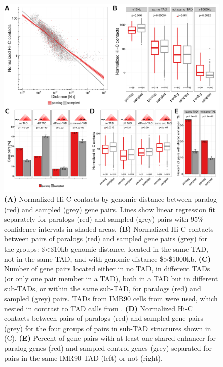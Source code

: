 \documentclass[a4paper,twoside=true,openright,parskip=full,chapterprefix=true,11pt,headings=normal,bibliography=totoc,listof=totoc,titlepage=on,captions=tableabove,draft=false]{scrreprt}
\theoremstyle{definition}
\theoremstyle{definition}
\theoremstyle{definition}
\theoremstyle{remark}
\begin{document}
\begin{figure}

{\centering \includegraphics[width=0.8\linewidth]{figures/paralog/fig4_09} 

}

\caption{\textbf{(A)} Normalized Hi-C contacts by genomic
distance between paralog (red) and sampled (grey) gene pairs. Lines show
linear regression fit separately for paralogs (red) and sampled (grey)
pairs with 95\% confidence intervals in shaded areas. \textbf{(B)}
Normalized Hi-C contacts between pairs of paralogs (red) and sampled
gene pairs (grey) for the groups: \$\textless{}\$10kb genomic distance,
located in the same TAD, not in the same TAD, and with genomic distance
\$\textgreater{}\$1000kb. \textbf{(C)} Number of gene pairs located
either in no TAD, in different TADs (or only one pair member in a TAD),
both in a TAD but in different sub-TADs, or within the same sub-TAD, for
paralogs (red) and sampled (grey) pairs. TADs from IMR90 cells from
\citep{Rao2014} were used, which nested in contrast to TAD calls from
\citep{Dixon2012}. \textbf{(D)} Normalized Hi-C contacts between pairs
of paralogs (red) and sampled gene pairs (grey) for the four groups of
pairs in sub-TAD structures shown in (C). \textbf{(E)} Percent of gene
pairs with at least one shared enhancer for paralog genes (red) and
sampled control genes (grey) separated for pairs in the same IMR90 TAD
(left) or not (right).}\label{fig:closePairs}
\end{figure}
\end{document}
